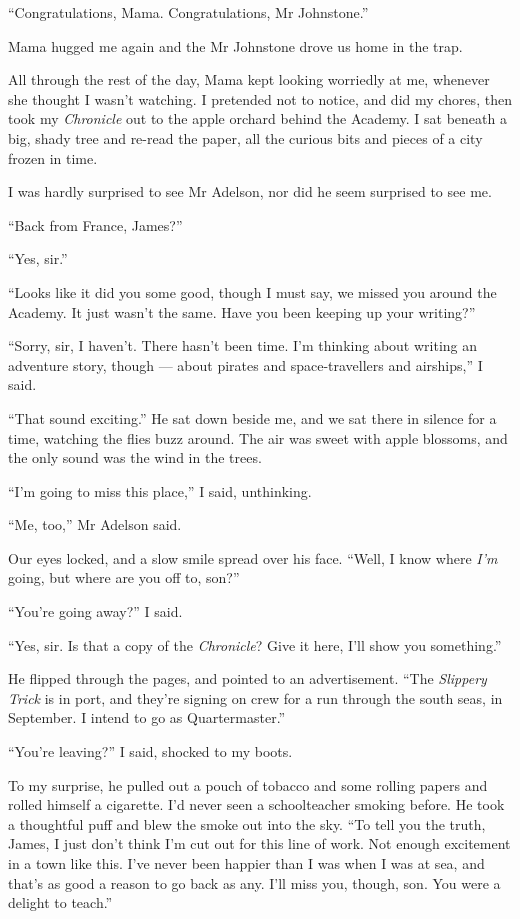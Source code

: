 ``Congratulations, Mama. Congratulations, Mr Johnstone.''

Mama hugged me again and the Mr Johnstone drove us home in the
trap.

\tb

All through the rest of the day, Mama kept looking worriedly at me,
whenever she thought I wasn't watching. I pretended not to notice,
and did my chores, then took my \emph{Chronicle} out to the apple
orchard behind the Academy. I sat beneath a big, shady tree and
re-read the paper, all the curious bits and pieces of a city frozen
in time.

I was hardly surprised to see Mr Adelson, nor did he seem surprised
to see me.

``Back from France, James?''

``Yes, sir.''

``Looks like it did you some good, though I must say, we missed you around the 
Academy. It just wasn't the same. Have you been keeping up your writing?''

``Sorry, sir, I haven't. There hasn't been time. I'm thinking about writing an 
adventure story, though --- about pirates and space-travellers and airships,''
I said.

``That sound exciting.'' He sat down beside me, and we sat there in
silence for a time, watching the flies buzz around. The air was
sweet with apple blossoms, and the only sound was the wind in the
trees.

``I'm going to miss this place,'' I said, unthinking.

``Me, too,'' Mr Adelson said.

Our eyes locked, and a slow smile spread over his face.
``Well, I know where \emph{I'm} going, but where are you off to, son?''

``You're going away?'' I said.

``Yes, sir. Is that a copy of the \emph{Chronicle}? Give it here, I'll show you 
something.''

He flipped through the pages, and pointed to an advertisement.
``The \emph{Slippery Trick} is in port, and they're signing on crew for a run 
through the south seas, in September. I intend to go as Quartermaster.''

``You're leaving?'' I said, shocked to my boots.

To my surprise, he pulled out a pouch of tobacco and some rolling
papers and rolled himself a cigarette. I'd never seen a
schoolteacher smoking before. He took a thoughtful puff and blew
the smoke out into the sky.
``To tell you the truth, James, I just don't think I'm cut out for this line of 
work. Not enough excitement in a town like this. I've never been happier than I 
was when I was at sea, and that's as good a reason to go back as any. I'll miss 
you, though, son. You were a delight to teach.''

